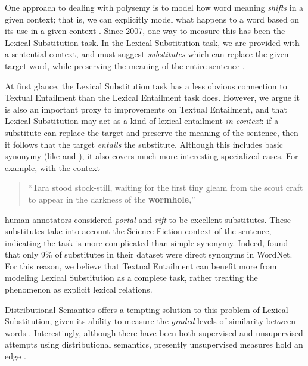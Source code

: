 One approach to dealing with polysemy is to model how word
meaning {\em shifts} in a given context; that is, we can explicitly model what
happens to a word based on its use in a given context
\cite{erk:2008:emnlp,erk:2010:gems}. Since 2007, one way to measure this has
been the Lexical Substitution task. In the Lexical Substitution task, we are
provided with a sentential context, and must suggest {\em substitutes} which
can replace the given target word, while preserving the meaning of the entire
sentence \cite{mccarthy:2007:semeval,biemann:2012:lrec,kremer:2014:eacl}.

At first glance, the Lexical Substitution task has a less obvious connection to
Textual Entailment than the Lexical Entailment task does. However, we argue
it is also an important proxy to improvements on Textual Entailment, and that
Lexical Substitution may act as a kind of lexical entailment {\em
in context}: if a substitute can replace the target and preserve the meaning of
the sentence, then it follows that the target {\em entails} the substitute.
Although this includes basic synonymy (like  and ), it
also covers much more interesting specialized cases. For example, with the
context
\begin{quote}
  ``Tara stood stock-still, waiting for the first tiny gleam from the
  scout craft to appear in the darkness of the {\bf wormhole},''
\end{quote}
human annotators considered {\em portal} and {\em rift} to be excellent
substitutes. These substitutes take into account the Science Fiction context of the
sentence, indicating the task is more complicated than simple synonymy. Indeed,
 found that only 9\% of substitutes in their dataset were
direct synonyms in WordNet.  For this reason, we believe that Textual
Entailment can benefit more from modeling Lexical Substitution as a complete
task, rather treating the phenomenon as explicit lexical relations.

Distributional Semantics offers a tempting solution to this problem of Lexical
Substitution, given its ability to measure the {\em graded} levels of similarity
between words \cite{erk:2008:emnlp}. Interestingly, although there have been
both supervised \cite{biemann:2012:lrec,szarvas:2013:naacl} and unsupervised
attempts
\cite{erk:2008:emnlp,dinu:2010:emnlp,thater:2010:acl,vandecruys:2011:emnlp,kremer:2014:eacl,melamud:2015:naacl,melamud:2015:vsm,kawakami:2016:iclr,roller:2016:naacl}
using distributional semantics, presently unsupervised measures hold
an edge \cite{melamud:2015:naacl,melamud:2016:conll}.

